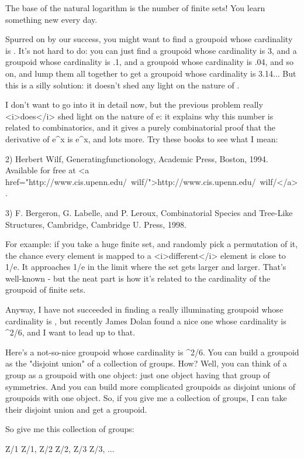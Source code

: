 The base of the natural logarithm is the number of finite sets!
You learn something new every day.

Spurred on by our success, you might want to find a groupoid whose
cardinality is \pi .  It's not hard to do: you can just find a
groupoid whose cardinality is 3, and a groupoid whose cardinality is
.1, and a groupoid whose cardinality is .04, and so on, and lump them
all together to get a groupoid whose cardinality is 3.14...  But this
is a silly solution: it doesn't shed any light on the nature of \pi .

I don't want to go into it in detail now, but the previous problem
really <i>does</i> shed light on the nature of e: it explains why this
number is related to combinatorics, and it gives a purely
combinatorial proof that the derivative of e^{x} is
e^{x}, and lots more.  Try these books to see what I mean:

2) Herbert Wilf, Generatingfunctionology, Academic Press, Boston,
1994.  Available for free at <a
href="http://www.cis.upenn.edu/~wilf/">http://www.cis.upenn.edu/~wilf/</a>.

3) F. Bergeron, G. Labelle, and P. Leroux, Combinatorial Species and
Tree-Like Structures, Cambridge, Cambridge U. Press, 1998.

For example: if you take a huge finite set, and randomly pick a
permutation of it, the chance every element is mapped to a
<i>different</i> element is close to 1/e.  It approaches 1/e in the
limit where the set gets larger and larger.  That's well-known - but
the neat part is how it's related to the cardinality of the groupoid
of finite sets.

Anyway, I have not succeeded in finding a really illuminating
groupoid whose cardinality is \pi , but recently James Dolan found a
nice one whose cardinality is \pi ^{2}/6, and I want to lead
up to that.

Here's a not-so-nice groupoid whose cardinality is \pi ^{2}/6.
You can build a groupoid as the "disjoint union" of a collection of
groups.  How?  Well, you can think of a group as a groupoid with one
object: just one object having that group of symmetries.  And you can
build more complicated groupoids as disjoint unions of groupoids with
one object.  So, if you give me a collection of groups, I can take
their disjoint union and get a groupoid.

So give me this collection of groups:

Z/1 \times  Z/1, Z/2 \times  Z/2, Z/3 \times  Z/3, ...

